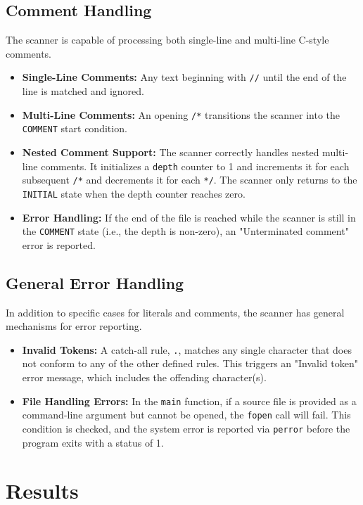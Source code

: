 \documentclass[12pt,a4paper]{article}
\begin{document}
\subsection{Comment Handling}
The scanner is capable of processing both single-line and multi-line C-style comments.
\begin{itemize}
    \item \textbf{Single-Line Comments:} Any text beginning with \texttt{//} until the end of the line is matched and ignored.
    \item \textbf{Multi-Line Comments:} An opening \texttt{/*} transitions the scanner into the \texttt{COMMENT} start condition.
    \item \textbf{Nested Comment Support:} The scanner correctly handles nested multi-line comments. It initializes a \texttt{depth} counter to 1 and increments it for each subsequent \texttt{/*} and decrements it for each \texttt{*/}. The scanner only returns to the \texttt{INITIAL} state when the depth counter reaches zero.
    \item \textbf{Error Handling:} If the end of the file is reached while the scanner is still in the \texttt{COMMENT} state (i.e., the depth is non-zero), an "Unterminated comment" error is reported.
\end{itemize}

\subsection{General Error Handling}
In addition to specific cases for literals and comments, the scanner has general mechanisms for error reporting.
\begin{itemize}
    \item \textbf{Invalid Tokens:} A catch-all rule, \texttt{.}, matches any single character that does not conform to any of the other defined rules. This triggers an "Invalid token" error message, which includes the offending character(s).
    \item \textbf{File Handling Errors:} In the \texttt{main} function, if a source file is provided as a command-line argument but cannot be opened, the \texttt{fopen} call will fail. This condition is checked, and the system error is reported via \texttt{perror} before the program exits with a status of 1.
\end{itemize}

\vspace{5cm}

\section{Results}
\end{document}
